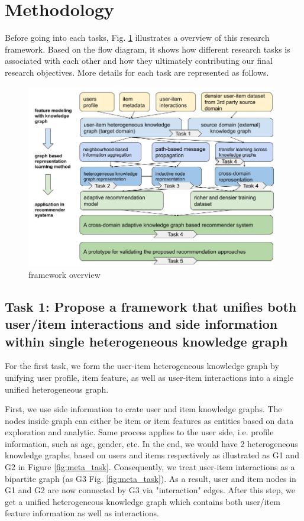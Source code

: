 \section{Methodology}

Before going into each tasks, Fig. \ref{fig:framework} illustrates a overview of this research framework. Based on the flow diagram, it shows how different research tasks is associated with each other and how they ultimately contributing our final research objectives. More details for each task are represented as follows.

\begin{figure}[!ht]
    \centering
    \includegraphics[width=0.98\textwidth]{figs/framework_overview.jpg}
    \caption{framework overview}\label{fig:framework}
\end{figure}

\subsection{Task 1: Propose a framework that unifies both user/item interactions and side information within single heterogeneous knowledge graph}

For the first task, we form the user-item heterogeneous knowledge graph by unifying user profile, item feature, as well as user-item interactions into a single unified heterogeneous graph.

First, we use side information to crate user and item knowledge graphs. The nodes inside graph can either be item or item features as entities based on data exploration and analytic. Same process applies to the user side, i.e. profile information, such as age, gender, etc. In the end, we would have 2 heterogeneous knowledge graphs, based on users and items respectively as illustrated as G1 and G2 in Figure \ref{fig:meta_task}.
Consequently, we treat user-item interactions as a bipartite graph (as G3 Fig. \ref{fig:meta_task}). As a result, user and item nodes in G1 and G2 are now connected by G3 via "interaction" edges. After this step, we get a unified heterogeneous knowledge graph which contains both user/item feature information as well as interactions.



